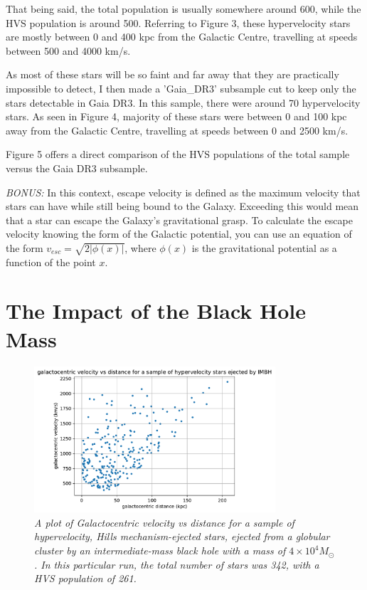 \documentclass{article}
\begin{document}
\medskip

That being said, the total population is usually somewhere around 600, while the HVS population is around 500. Referring to Figure 3, these hypervelocity stars are mostly between 0 and 400 kpc from the Galactic Centre, travelling at speeds between 500 and 4000 km/s.

As most of these stars will be so faint and far away that they are practically impossible to detect, I then made a 'Gaia\_DR3' subsample cut to keep only the stars detectable in Gaia DR3. In this sample, there were around 70 hypervelocity stars. As seen in Figure 4, majority of these stars were between 0 and 100 kpc away from the Galactic Centre, travelling at speeds between 0 and 2500 km/s.

Figure 5 offers a direct comparison of the HVS populations of the total sample versus the Gaia DR3 subsample.

\textit{BONUS:}
In this context, escape velocity is defined as the maximum velocity that stars can have while still being bound to the Galaxy. Exceeding this would mean that a star can escape the Galaxy's gravitational grasp.
To calculate the escape velocity knowing the form of the Galactic potential, you can use an equation of the form $v_{esc} = \sqrt{2|\phi(x)|}$, where $\phi(x)$ is the gravitational potential as a function of the point $x$.

\section{The Impact of the Black Hole Mass}

\begin{figure}[htbp]
\caption{\textit{A plot of Galactocentric velocity vs distance for a sample of hypervelocity, Hills mechanism-ejected stars, ejected from a globular cluster by an intermediate-mass black hole with a mass of $4 \times 10^4 M_{\odot}$. In this particular run, the total number of stars was 342, with a HVS population of 261.}}
\centering
\includegraphics[width=0.8\textwidth]{GCv_vs_GCdist_hyp_2.pdf}
\end{figure}
\end{document}
